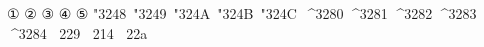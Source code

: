 \documentclass[varwidth, margin=6pt]{standalone}
\begin{document}
① ② ③ ④ ⑤
    
\char"3248\    \char"3249\    \char"324A\    \char"324B\    \char"324C\
^^^^3280       ^^^^3281       ^^^^3282       ^^^^3283       ^^^^3284
^^^^^1f229     ^^^^^1f214     ^^^^^1f22a
\end{document}
